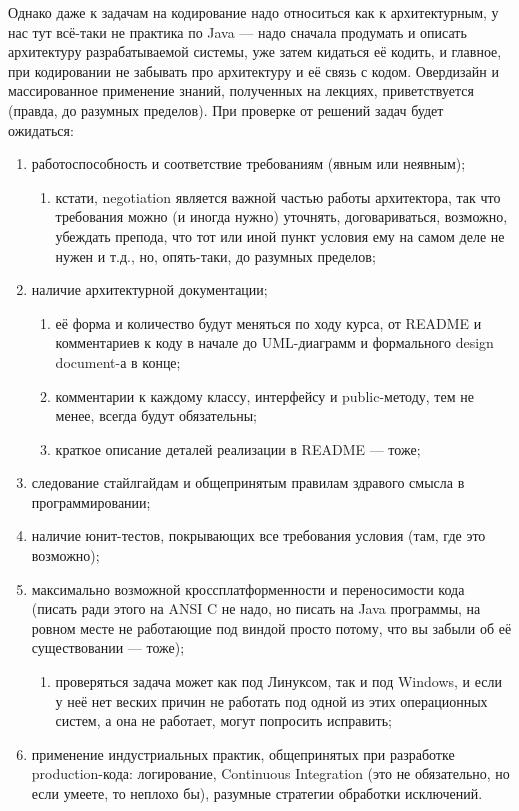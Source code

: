 \documentclass[a5paper]{article}
\begin{document}
Однако даже к задачам на кодирование надо относиться как к архитектурным, у нас тут всё-таки не практика по Java --- надо сначала продумать и описать архитектуру разрабатываемой системы, уже затем кидаться её кодить, и главное, при кодировании не забывать про архитектуру и её связь с кодом. Овердизайн и массированное применение знаний, полученных на лекциях, приветствуется (правда, до разумных пределов). При проверке от решений задач будет ожидаться:\nopagebreak

\begin{enumerate}
	\item работоспособность и соответствие требованиям (явным или неявным);
  \begin{enumerate}
		\item кстати, negotiation является важной частью работы архитектора, так что требования можно (и иногда нужно) уточнять, договариваться, возможно, убеждать препода, что тот или иной пункт условия ему на самом деле не нужен и т.д., но, опять-таки, до разумных пределов;
  \end{enumerate}
	\item наличие архитектурной документации;
  \begin{enumerate}
		\item её форма и количество будут меняться по ходу курса, от README и комментариев к коду в начале до UML-диаграмм и формального design document-а в конце;
		\item комментарии к каждому классу, интерфейсу и public-методу, тем не менее, всегда будут обязательны;
		\item краткое описание деталей реализации в README --- тоже;
  \end{enumerate}
	\item следование стайлгайдам и общепринятым правилам здравого смысла в программировании;
	\item наличие юнит-тестов, покрывающих все требования условия (там, где это возможно);
	\item максимально возможной кроссплатформенности и переносимости кода (писать ради этого на ANSI C не надо, но писать на Java программы, на ровном месте не работающие под виндой просто потому, что вы забыли об её существовании --- тоже);
  \begin{enumerate}
		\item проверяться задача может как под Линуксом, так и под Windows, и если у неё нет веских причин не работать под одной из этих операционных систем, а она не работает, могут попросить исправить;
  \end{enumerate}
	\item применение индустриальных практик, общепринятых при разработке production-кода: логирование, Continuous Integration (это не обязательно, но если умеете, то неплохо бы), разумные стратегии обработки исключений.
\end{enumerate}
\end{document}
